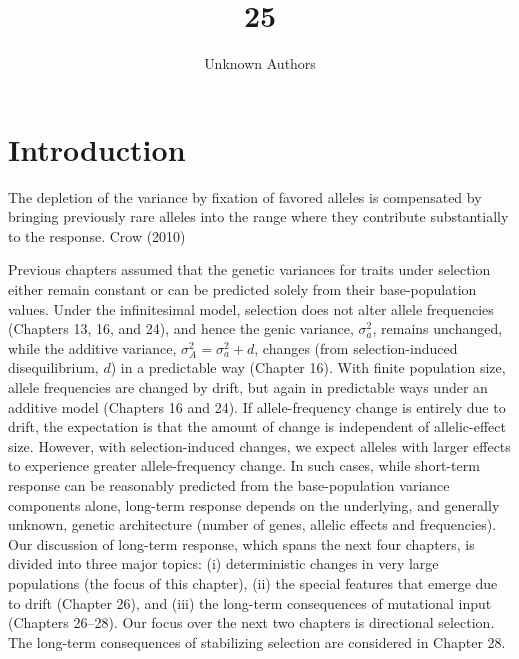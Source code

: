 \documentclass{article}
\title{25}
\author{Unknown Authors}
\date{}
\begin{document}
\maketitle

\begin{abstract}

\end{abstract}

\section{Introduction}
The depletion of the variance by fixation of favored alleles is compensated by bringing previously rare alleles into the range where they contribute substantially to the response. Crow (2010)

Previous chapters assumed that the genetic variances for traits under selection either remain constant or can be predicted solely from their base-population values. Under the infinitesimal model, selection does not alter allele frequencies (Chapters 13, 16, and 24), and hence the genic variance,  $ \sigma_a^2 $, remains unchanged, while the additive variance,  $ \sigma_A^2 = \sigma_a^2 + d $, changes (from selection-induced disequilibrium,  $ d $) in a predictable way (Chapter 16). With finite population size, allele frequencies are changed by drift, but again in predictable ways under an additive model (Chapters 16 and 24). If allele-frequency change is entirely due to drift, the expectation is that the amount of change is independent of allelic-effect size. However, with selection-induced changes, we expect alleles with larger effects to experience greater allele-frequency change. In such cases, while short-term response can be reasonably predicted from the base-population variance components alone, long-term response depends on the underlying, and generally unknown, genetic architecture (number of genes, allelic effects and frequencies). Our discussion of long-term response, which spans the next four chapters, is divided into three major topics: (i) deterministic changes in very large populations (the focus of this chapter), (ii) the special features that emerge due to drift (Chapter 26), and (iii) the long-term consequences of mutational input (Chapters 26–28). Our focus over the next two chapters is directional selection. The long-term consequences of stabilizing selection are considered in Chapter 28.
\end{document}
